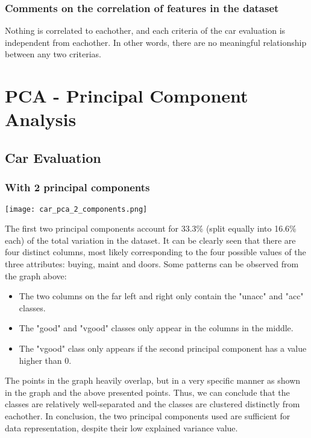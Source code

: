 \subsubsection{Comments on the correlation of features in the dataset}

Nothing is correlated to eachother, and each criteria of the car evaluation is
independent from eachother. In other words, there are no meaningful relationship
between any two criterias.

\section{PCA - Principal Component Analysis}

\subsection{Car Evaluation}

\subsubsection{With 2 principal components}

\texttt{[image: car\_pca\_2\_components.png]}

The first two principal components account for 33.3\% (split equally into 16.6\%
each) of the total variation in the dataset. It can be clearly seen that there
are four distinct columns, most likely corresponding to the four possible
values of the three attributes: buying, maint and doors. Some patterns can be
observed from the graph above:

\begin{itemize}
    \item The two columns on the far left and right only contain the "unacc" and "acc" classes.
    \item The "good" and "vgood" classes only appear in the columns in the middle.
    \item The "vgood" class only appears if the second principal component has a value higher than 0.
\end{itemize}

The points in the graph heavily overlap, but in a very specific manner as shown
in the graph and the above presented points. Thus, we can conclude that the
classes are relatively well-separated and the classes are clustered distinctly
from eachother. In conclusion, the two principal components used are sufficient
for data representation, despite their low explained variance value.

